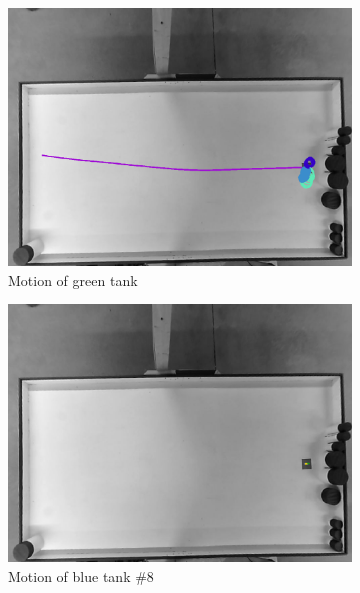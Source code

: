 \begin{figure}
	\begin{subfigure}[t]{0.3\textwidth}
		\includegraphics[width=\textwidth]{../hardwareX_paper/robot_0.png}
		\caption{Motion of green tank}
	\end{subfigure}
	\begin{subfigure}[t]{0.3\textwidth}
		\includegraphics[width=\textwidth]{../hardwareX_paper/robot_8.png}
		\caption{Motion of blue tank \#8}
	\end{subfigure}
	\begin{subfigure}[t]{0.3\textwidth}

\end{subfigure}
\end{figure}
